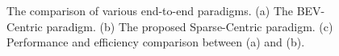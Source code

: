 \begin{figure}[tb]
\begin{subfigure}{0.38\linewidth}
  \end{subfigure}
  
  \caption{The comparison of various end-to-end paradigms. (a) The BEV-Centric paradigm. (b) The proposed Sparse-Centric paradigm. (c) Performance and efficiency comparison between (a) and (b).}
  \label{fig:pipeline}
\end{figure}